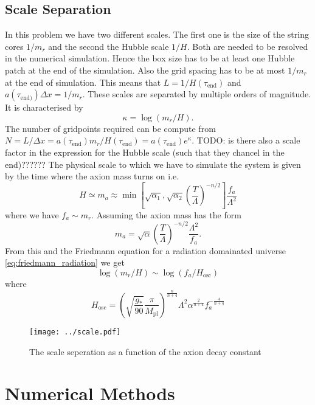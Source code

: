 \documentclass[a4paper]{article}
\begin{document}
\subsection{Scale Separation}
In this problem we have two different scales. 
The first one is the size of the string cores $1/m_r$ and the second the Hubble scale $1/H$.
Both are needed to be resolved in the numerical simulation.
Hence the box size has to be at least one Hubble patch at the end of the simulation.
Also the grid spacing has to be at most $1/m_r$ at the end of simulation.
This means that $L = 1 / H(\tau_\mathrm{end})$ and $a(\tau_\mathrm{end)}) \Delta x = 1/m_r$.
These scales are separated by multiple orders of magnitude. It is characterised by 
\begin{equation}
	\kappa = \log(m_r / H).
\end{equation} 
The number of gridpoints required can be compute from $N = L / \Delta x = a(\tau_\mathrm{end}) m_r / H(\tau_\mathrm{end}) = a(\tau_\mathrm{end})e^{\kappa}$.
TODO: is there also a scale factor in the expression for the Hubble scale (such that they chancel in the end)??????
The physical scale to which we have to simulate the system is given by the time where the axion mass turns on i.e.
\begin{equation}
	H \simeq m_a \approx \min \left[ \sqrt{\alpha_1}, \sqrt{\alpha_2} \left( \frac{T}{\Lambda} \right)^{-n/2} \right] \frac{f_a}{\Lambda^2}
\end{equation}
where we have $f_a \sim m_r$.
Assuming the axion mass has the form
\begin{equation}
	m_a = \sqrt{\alpha} \left( \frac{T}{\Lambda} \right)^{-n/2} \frac{\Lambda^2}{f_a}.
\end{equation}
From this and the Friedmann equation for a radiation domainated universe  \eqref{eq:friedmann_radiation} we get 
\begin{equation}
	\log(m_r/H) \sim \log(f_a/H_\mathrm{osc})
\end{equation}
where 
\begin{equation}
	H_\mathrm{osc} = \left( \sqrt{\frac{g_*}{90}} \frac{\pi}{M_\mathrm{pl}} \right)^{\frac{n}{n + 4}} \Lambda^2 \alpha^{\frac{2}{n + 4}} f_a^{- \frac{4}{n + 4}}
\end{equation}
\begin{figure}[H]
	\texttt{[image: ../scale.pdf]}
	\caption{The scale seperation as a function of the axion decay constant}
\end{figure}


\section{Numerical Methods}
\end{document}
